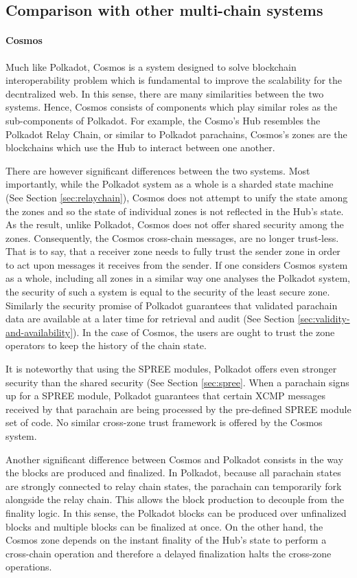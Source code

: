 \subsection{Comparison with other multi-chain systems}\label{sec:comparison}

\paragraph{Cosmos} 

Much like Polkadot, Cosmos is a system designed to solve blockchain interoperability problem which is fundamental to improve the scalability for the decntralized web. In this sense, there are many similarities between the two systems. Hence, Cosmos consists of components which play similar roles as the sub-components of Polkadot. For example, the Cosmo's Hub resembles the Polkadot Relay Chain, or similar to Polkadot parachains, Cosmos's zones are the blockchains which use the Hub to interact between one another. 

There are however significant differences between the two systems. Most importantly, while the Polkadot system as a whole is a sharded state machine (See Section \ref{sec:relaychain}), Cosmos does not attempt to unify the state among the zones and so the state of individual zones is not reflected in the Hub's state. As the result, unlike Polkadot, Cosmos does not offer shared security among the zones. Consequently, the Cosmos cross-chain messages, are no longer trust-less. That is to say, that a receiver zone needs to fully trust the sender zone in order to act upon messages it receives from the sender. If one considers Cosmos system as a whole, including all zones in a similar way one analyses the Polkadot system, the security of such a system is equal to the security of the least secure zone. Similarly the security promise of Polkadot guarantees that validated parachain data are available at a later time for retrieval and audit (See Section \ref{sec:validity-and-availability}). In the case of Cosmos, the users are ought to trust the zone operators to keep the history of the chain state.

It is noteworthy that using the SPREE modules, Polkadot offers even stronger security than the shared security (See Section \ref{sec:spree}. When a parachain signs up for a SPREE module, Polkadot guarantees that certain XCMP messages received by that parachain are being processed by the pre-defined SPREE module set of code. No similar cross-zone trust framework is offered by the Cosmos system.

Another significant difference between Cosmos and Polkadot consists in the way the blocks are produced and finalized. In Polkadot, because all parachain states are strongly connected to relay chain states, the parachain can temporarily fork alongside the relay chain. This allows the block production to decouple from the finality logic. In this sense, the Polkadot blocks can be produced over unfinalized blocks and multiple blocks can be finalized at once. On the other hand, the Cosmos zone depends on the instant finality of the Hub's state to perform a cross-chain operation and therefore a delayed finalization halts the cross-zone operations.

